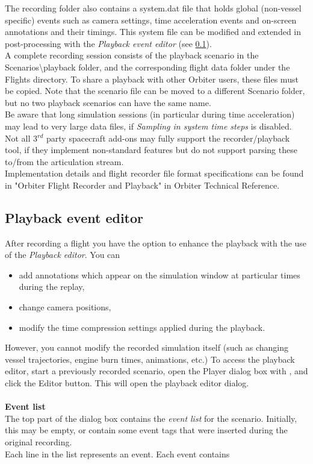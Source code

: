 \documentclass[Orbiter User Manual.tex]{subfiles}
\begin{document}
\noindent
The recording folder also contains a system.dat file that holds global (non-vessel specific) events such as camera settings, time acceleration events and on-screen annotations and their timings. This system file can be modified and extended in post-processing with the \textit{Playback event editor} (see \ref{sec:flight_playbackedit}).\\
A complete recording session consists of the playback scenario in the Scenarios\textbackslash playback folder, and the corresponding flight data folder under the Flights directory. To share a playback with other Orbiter users, these files must be copied. Note that the scenario file can be moved to a different Scenario folder, but no two playback scenarios can have the same name.\\
Be aware that long simulation sessions (in particular during time acceleration) may lead to very large data files, if \textit{Sampling in system time steps} is disabled.\\
Not all 3$^{rd}$ party spacecraft add-ons may fully support the recorder/playback tool, if they implement non-standard features but do not support parsing these to/from the articulation stream.\\
Implementation details and flight recorder file format specifications can be found in "Orbiter Flight Recorder and Playback" in Orbiter Technical Reference.


\subsection{Playback event editor}
\label{sec:flight_playbackedit}
After recording a flight you have the option to enhance the playback with the use of the \textit{Playback editor}. You can

\begin{itemize}
\item add annotations which appear on the simulation window at particular times during the replay,
\item change camera positions,
\item modify the time compression settings applied during the playback.
\end{itemize}

\noindent
However, you cannot modify the recorded simulation itself (such as changing vessel trajectories, engine burn times, animations, etc.) To access the playback editor, start a previously recorded scenario, open the Player dialog box with \Ctrl{}, and click the Editor button. This will open the playback editor dialog.\\
\\
\textbf{Event list}\\
The top part of the dialog box contains the \textit{event list} for the scenario. Initially, this may be empty, or contain some event tags that were inserted during the original recording.\\
Each line in the list represents an event. Each event contains
\end{document}
